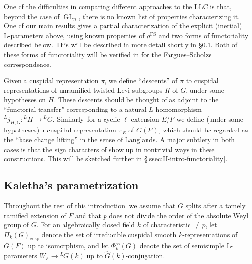 \documentclass[reqno]{amsart}
\numberwithin{equation}{subsection}
\newcommand{\wh}[1]{\widehat{#1}}
\newcommand{\co}{\colon}
\newcommand{\ld}{{}^L}
\DeclareMathOperator{\GL}{GL}
\DeclareMathOperator{\FS}{FS}
\renewcommand{\ss}{\mathrm{ss}}
\theoremstyle{remark}
\numberwithin{equation}{subsection}
\numberwithin{figure}{subsection}
\begin{document}
One of the difficulties in comparing different approaches to the LLC is that, beyond the case of $\GL_n$, there is no known list of properties characterizing it. One of our main results gives a partial characterization of the explicit (inertial) L-parameters above, using known properties of $\rho^{\FS}$ and two forms of functoriality described below. This will be described in more detail shortly in \S \ref{ssec:II-intro-parameter}. Both of these forms of functoriality will be verified in \cite{CF26b} for the Fargues--Scholze correspondence.

Given a cuspidal representation $\pi$, we define ``descents'' of $\pi$ to cuspidal representations of unramified twisted Levi subgroups $H$ of $G$, under some hypotheses on $H$. These descents should be thought of as adjoint to the ``functorial transfer'' corresponding to a natural $L$-homomorphism $\ld j_{H,G} \co \ld H \rightarrow \ld G$. Similarly, for a cyclic $\ell$-extension $E/F$ we define (under some hypotheses) a cuspidal representation $\pi_E$ of $G(E)$, which should be regarded as the ``base change lifting'' in the sense of Langlands. A major subtlety in both cases is that the sign characters of \cite{FKS23} show up in nontrivial ways in these constructions. This will be sketched further in \S \ref{ssec:II-intro-functoriality}.


\subsection{Kaletha's parametrization}\label{ssec:II-intro-parameter} Throughout the rest of this introduction, we assume that $G$ splits after a tamely ramified extension of $F$ and that $p$ does not divide the order of the absolute Weyl group of $G$. For an algebraically closed field $k$ of characteristic $\neq p$, let $\Pi_k(G)_{\mathrm{cusp}}$ denote the set of irreducible cuspidal smooth $k$-representations of $G(F)$ up to isomorphism, and let $\Phi_k^{\ss}(G)$ denote the set of semisimple L-parameters $W_F \to \ld G(k)$ up to $\wh G(k)$-conjugation. 
\end{document}
